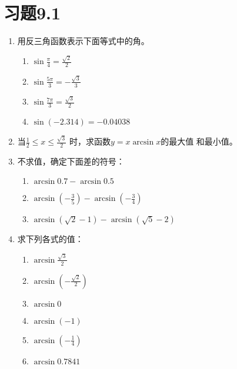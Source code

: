 \section*{习题9.1}
\begin{enumerate}
    \item 用反三角函数表示下面等式中的角。
    \begin{multicols}{2}
\begin{enumerate}
    \item $\sin\frac{\pi}{4}=\frac{\sqrt{2}}{2}$
    \item $\sin\frac{5\pi}{3}=-\frac{\sqrt{3}}{3}$
    \item $\sin\frac{7\pi}{3}=\frac{\sqrt{3}}{2}$
    \item $\sin(-2.314)=-0.04038$
\end{enumerate}
    \end{multicols}
    \item 当$\frac{1}{2}\le x\le\frac{\sqrt{3}}{2}$
    时，求函数$y=x\arcsin x$的最大值
    和最小值。
    \item 不求值，确定下面差的符号：
\begin{enumerate}
    \item $\arcsin 0.7-\arcsin 0.5$
    \item $\arcsin\left(-\frac{3}{5}\right)-\arcsin\left(-\frac{3}{4}\right)$
    \item $\arcsin\left(\sqrt{2}-1\right)-\arcsin\left(\sqrt{5}-2\right)$
\end{enumerate}
\item 求下列各式的值：
\begin{multicols}{2}
\begin{enumerate}
    \item $\arcsin\frac{\sqrt{3}}{2}$
    \item $\arcsin\left(-\frac{\sqrt{2}}{2}\right)$
    \item $\arcsin0$
    \item $\arcsin(-1)$
    \item $\arcsin\left(-\frac{1}{4}\right)$
    \item $\arcsin0.7841$
\end{enumerate}
\end{multicols}


\end{enumerate}
